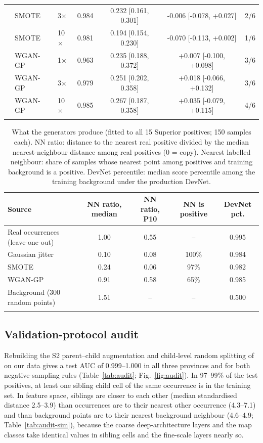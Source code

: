 \documentclass[pdflatex,sn-apa]{sn-jnl}
\begin{document}
\begin{table}[t]
\begin{tabular*}{\textwidth}{@{\extracolsep\fill}lllcccc}
 & SMOTE & 3$\times$ & 0.984 & 0.232 [0.161, 0.301] & -0.006 [-0.078, +0.027] & 2/6 \\
 & SMOTE & 10$\times$ & 0.981 & 0.194 [0.154, 0.230] & -0.070 [-0.113, +0.002] & 1/6 \\
 & WGAN-GP & 1$\times$ & 0.963 & 0.235 [0.188, 0.372] & +0.007 [-0.100, +0.098] & 3/6 \\
 & WGAN-GP & 3$\times$ & 0.979 & 0.251 [0.202, 0.358] & +0.018 [-0.066, +0.132] & 3/6 \\
 & WGAN-GP & 10$\times$ & 0.985 & 0.267 [0.187, 0.358] & +0.035 [-0.079, +0.115] & 4/6 \\
\botrule
\end{tabular*}
\end{table}

\begin{table}[t]
\caption{What the generators produce (fitted to all 15 Superior positives; 150 samples each). NN ratio: distance to the nearest real positive divided by the median nearest-neighbour distance among real positives (0 = copy). Nearest labelled neighbour: share of samples whose nearest point among positives and training background is a positive. DevNet percentile: median score percentile among the training background under the production DevNet.}\label{tab:aug-diag}
\footnotesize
\setlength{\tabcolsep}{2.5pt}
\begin{tabular*}{\textwidth}{@{\extracolsep\fill}lcccc}
\toprule
Source & NN ratio, median & NN ratio, P10 & NN is positive & DevNet pct. \\
\midrule
Real occurrences (leave-one-out) & 1.00 & 0.55 & -- & 0.995 \\
Gaussian jitter & 0.10 & 0.08 & 100\% & 0.984 \\
SMOTE & 0.24 & 0.06 & 97\% & 0.982 \\
WGAN-GP & 0.91 & 0.58 & 65\% & 0.985 \\
Background (300 random points) & 1.51 & -- & -- & 0.500 \\
\botrule
\end{tabular*}
\end{table}

\subsection{Validation-protocol audit}\label{sec:res-audit}

Rebuilding the S2 parent--child augmentation and child-level random splitting of \citet{Parsa2024} on our data gives a test AUC of 0.999--1.000 in all three provinces and for both negative-sampling rules (Table~\ref{tab:audit}; Fig.~\ref{fig:audit}). In 97--99\% of the test positives, at least one sibling child cell of the same occurrence is in the training set. In feature space, siblings are closer to each other (median standardised distance 2.5--3.9) than occurrences are to their nearest other occurrence (4.3--7.1) and than background points are to their nearest background neighbour (4.6--4.9; Table~\ref{tab:audit-sim}), because the coarse deep-architecture layers and the map classes take identical values in sibling cells and the fine-scale layers nearly so.
\end{document}
